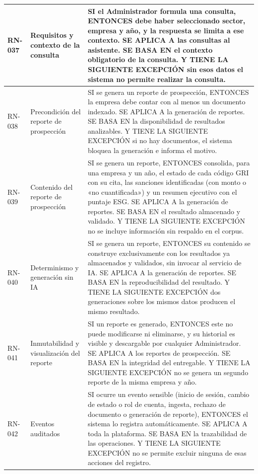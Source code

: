 \begin{longtable}{|C{1.4cm}|L{4.0cm}|L{9.4cm}|}
\hline
RN-037 & Requisitos y contexto de la consulta & SI el Administrador formula una consulta, ENTONCES debe haber seleccionado sector, empresa y año, y la respuesta se limita a ese contexto. SE APLICA A las consultas al asistente. SE BASA EN el contexto obligatorio de la consulta. Y TIENE LA SIGUIENTE EXCEPCIÓN sin esos datos el sistema no permite realizar la consulta. \\
\hline
RN-038 & Precondición del reporte de prospección & SI se genera un reporte de prospección, ENTONCES la empresa debe contar con al menos un documento indexado. SE APLICA A la generación de reportes. SE BASA EN la disponibilidad de resultados analizables. Y TIENE LA SIGUIENTE EXCEPCIÓN si no hay documentos, el sistema bloquea la generación e informa el motivo. \\
\hline
RN-039 & Contenido del reporte de prospección & SI se genera un reporte, ENTONCES consolida, para una empresa y un año, el estado de cada código GRI con su cita, las sanciones identificadas (con monto o «no cuantificada») y un resumen ejecutivo con el puntaje ESG. SE APLICA A la generación de reportes. SE BASA EN el resultado almacenado y validado. Y TIENE LA SIGUIENTE EXCEPCIÓN no se incluye información sin respaldo en el corpus. \\
\hline
RN-040 & Determinismo y generación sin IA & SI se genera un reporte, ENTONCES su contenido se construye exclusivamente con los resultados ya almacenados y validados, sin invocar al servicio de IA. SE APLICA A la generación de reportes. SE BASA EN la reproducibilidad del resultado. Y TIENE LA SIGUIENTE EXCEPCIÓN dos generaciones sobre los mismos datos producen el mismo resultado. \\
\hline
RN-041 & Inmutabilidad y visualización del reporte & SI un reporte es generado, ENTONCES este no puede modificarse ni eliminarse, y su historial es visible y descargable por cualquier Administrador. SE APLICA A los reportes de prospección. SE BASA EN la integridad del entregable. Y TIENE LA SIGUIENTE EXCEPCIÓN no se genera un segundo reporte de la misma empresa y año. \\
\hline
RN-042 & Eventos auditados & SI ocurre un evento sensible (inicio de sesión, cambio de estado o rol de cuenta, ingesta, rechazo de documento o generación de reporte), ENTONCES el sistema lo registra automáticamente. SE APLICA A toda la plataforma. SE BASA EN la trazabilidad de las operaciones. Y TIENE LA SIGUIENTE EXCEPCIÓN no se permite excluir ninguna de esas acciones del registro. \\

\end{longtable}
